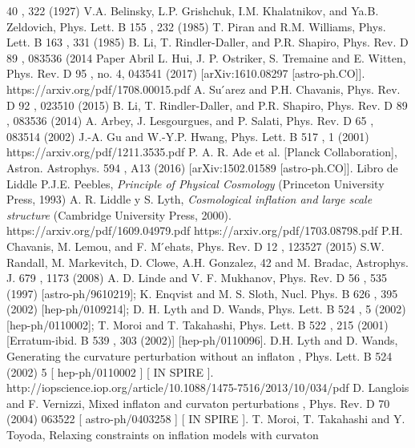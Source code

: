\documentclass[amssymb,twocolumn,prd,nofootinbib,showpacs]{revtex4-1}
\begin{document}
\begin{thebibliography}{9}
40
, 322 (1927)
  V.A.  Belinsky,  L.P.  Grishchuk,  I.M.  Khalatnikov,  and
Ya.B. Zeldovich, Phys. Lett. B
155
, 232 (1985)
  T.  Piran  and  R.M.  Williams,  Phys.  Lett.  B
163
,  331
(1985)
  B. Li, T. Rindler-Daller, and P.R. Shapiro, Phys. Rev.
D
89
, 083536 (2014
Paper Abril
 L.  Hui,  J.  P.  Ostriker,  S.  Tremaine  and  E.  Witten,  Phys.  Rev.  D
95
,  no.  4,  043541  (2017)
[arXiv:1610.08297 [astro-ph.CO]].
https://arxiv.org/pdf/1708.00015.pdf
 A. Su ́arez and P.H. Chavanis, Phys. Rev. D
92
, 023510
(2015)
  B. Li, T. Rindler-Daller, and P.R. Shapiro, Phys. Rev.
D
89
, 083536 (2014)
  A. Arbey, J. Lesgourgues, and P. Salati, Phys. Rev. D
65
, 083514 (2002)
  J.-A.  Gu  and  W.-Y.P.  Hwang,  Phys.  Lett.  B
517
,  1
(2001)
   https://arxiv.org/pdf/1211.3535.pdf
  P.   A.   R.   Ade
et   al.
[Planck   Collaboration],    Astron.   Astrophys.
594
,    A13   (2016)
[arXiv:1502.01589 [astro-ph.CO]].
Libro de Liddle
P.J.E. Peebles, \textit{Principle of Physical Cosmology} (Princeton University Press, 1993)
A. R. Liddle y S. Lyth, \textit{Cosmological inflation and large scale structure} (Cambridge University Press, 2000).
https://arxiv.org/pdf/1609.04979.pdf
https://arxiv.org/pdf/1703.08798.pdf
  P.H. Chavanis, M. Lemou, and F. M ́ehats, Phys. Rev.
D
12
, 123527 (2015)
  S.W. Randall, M. Markevitch, D. Clowe, A.H. Gonzalez,
42
and M. Bradac, Astrophys. J.
679
, 1173 (2008)
 A. D. Linde and V. F. Mukhanov, Phys. Rev. D
56
, 535 (1997) [astro-ph/9610219];
K.  Enqvist  and  M.  S.  Sloth,  Nucl.  Phys.  B
626
,  395  (2002)  [hep-ph/0109214];
D. H. Lyth and D. Wands, Phys. Lett. B
524
, 5 (2002) [hep-ph/0110002]; T. Moroi
and T. Takahashi, Phys. Lett. B
522
, 215 (2001) [Erratum-ibid. B
539
, 303 (2002)]
[hep-ph/0110096].
D.H. Lyth and D. Wands,
Generating the curvature perturbation without an inflaton
,
Phys. Lett.
B 524
(2002) 5
[
hep-ph/0110002
] [
IN
SPIRE
].
http://iopscience.iop.org/article/10.1088/1475-7516/2013/10/034/pdf
 D. Langlois and F. Vernizzi,
Mixed inflaton and curvaton perturbations
,
Phys. Rev.
D 70
(2004) 063522
[
astro-ph/0403258
] [
IN
SPIRE
].
 T. Moroi, T. Takahashi and Y. Toyoda,
Relaxing constraints on inflation models with curvaton

\end{thebibliography}
\end{document}
